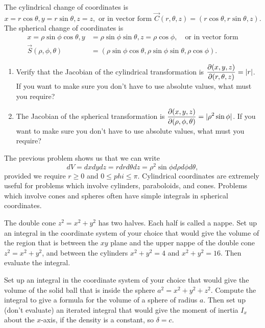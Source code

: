 \begin{problem}
 The cylindrical change of coordinates is 
$$x=r\cos\theta,y=r\sin\theta, z=z, \text{ or in vector form } \vec C(r,\theta,z) = (r\cos\theta,r\sin\theta, z).$$  
The spherical change of coordinates is 
\begin{align*}
x=\rho\sin\phi\cos\theta,y&=\rho\sin\phi\sin\theta, z=\rho\cos\phi, \quad \text{or in vector form}\\
\vec S(\rho,\phi,\theta) &= (\rho\sin\phi\cos\theta,\rho\sin\phi\sin\theta,\rho\cos\phi). 
\end{align*}
\begin{enumerate}
 \item Verify that the Jacobian of the cylindrical transformation is $\displaystyle\frac{\partial(x,y,z)}{\partial(r,\theta,z)} = |r|$.  If you want to make sure you don't have to use absolute values, what must you require?
 \item The Jacobian of the spherical transformation is $\displaystyle\frac{\partial(x,y,z)}{\partial(\rho,\phi,\theta)} = |\rho^2\sin\phi|$.  If you want to make sure you don't have to use absolute values, what must you require?
\end{enumerate}
\end{problem}

The previous problem shows us that we can write
$$dV=dxdydz = rdrd\theta dz = \rho^2\sin\phi d\rho d\phi d\theta,$$
provided we require $r\geq0$ and $0\leq phi\leq \pi$. 
Cylindrical coordinates are extremely useful for problems which involve cylinders, paraboloids, and cones. 
Problems which involve cones and spheres often have simple integrals in spherical coordinates.

\begin{problem}
 The double cone $z^2=x^2+y^2$ has two halves.  Each half is called a nappe. Set up an integral in the coordinate system of your choice that would give the volume of the region that is between the $xy$ plane and the upper nappe of the double cone $z^2=x^2+y^2$, and between the cylinders $x^2+y^2=4$ and $x^2+y^2=16$.  Then evaluate the integral.
\end{problem}

\begin{problem}
 Set up an integral in the coordinate system of your choice that would give the volume of the solid ball that is inside the sphere $a^2=x^2+y^2+z^2$. Compute the integral to give a formula for the volume of a sphere of radius $a$.  Then set up (don't evaluate) an iterated integral that would give the moment of inertia $I_x$ about the $x$-axis, if the density is a constant, so $\delta =c$. 
\end{problem}


